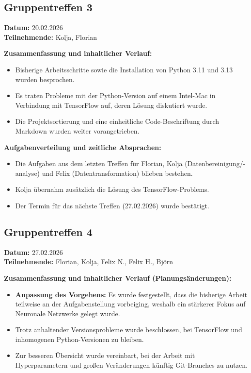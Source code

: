 \documentclass[9pt,a4paper,twocolumn,twoside]{tau-class/tau}
\begin{document}
\subsection*{Gruppentreffen 3}
\textbf{Datum:} 20.02.2026 \\
\textbf{Teilnehmende:} Kolja, Florian

\textbf{Zusammenfassung und inhaltlicher Verlauf:}
\begin{itemize}
    \item Bisherige Arbeitsschritte sowie die Installation von Python 3.11 und 3.13 wurden besprochen.
    \item Es traten Probleme mit der Python-Version auf einem Intel-Mac in Verbindung mit TensorFlow auf, deren Lösung diskutiert wurde.
    \item Die Projektsortierung und eine einheitliche Code-Beschriftung durch Markdown wurden weiter vorangetrieben.
\end{itemize}

\textbf{Aufgabenverteilung und zeitliche Absprachen:}
\begin{itemize}
    \item Die Aufgaben aus dem letzten Treffen für Florian, Kolja (Datenbereinigung/-analyse) und Felix (Datentransformation) blieben bestehen.
    \item Kolja übernahm zusätzlich die Lösung des TensorFlow-Problems.
    \item Der Termin für das nächste Treffen (27.02.2026) wurde bestätigt.
\end{itemize}

\subsection*{Gruppentreffen 4}
\textbf{Datum:} 27.02.2026 \\
\textbf{Teilnehmende:} Florian, Kolja, Felix N., Felix H., Björn

\textbf{Zusammenfassung und inhaltlicher Verlauf (Planungsänderungen):}
\begin{itemize}
    \item \textbf{Anpassung des Vorgehens:} Es wurde festgestellt, dass die bisherige Arbeit teilweise an der Aufgabenstellung vorbeiging, weshalb ein stärkerer Fokus auf Neuronale Netzwerke gelegt wurde.
    \item Trotz anhaltender Versionsprobleme wurde beschlossen, bei TensorFlow und inhomogenen Python-Versionen zu bleiben.
    \item Zur besseren Übersicht wurde vereinbart, bei der Arbeit mit Hyperparametern und großen Veränderungen künftig Git-Branches zu nutzen.
\end{itemize}
\end{document}

